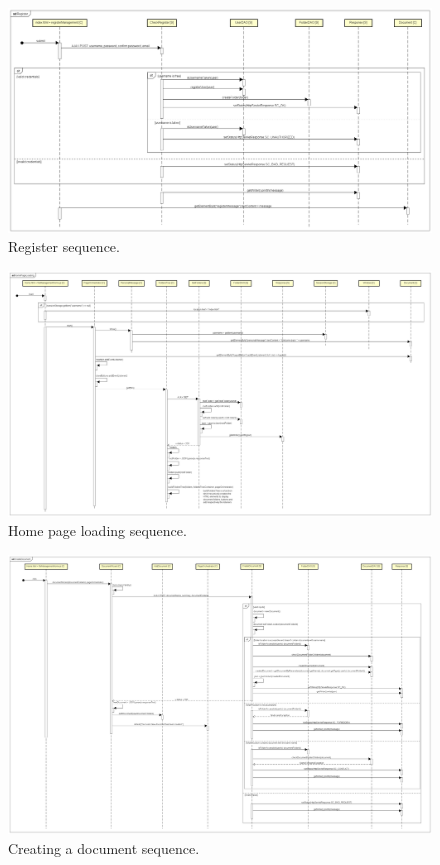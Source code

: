 \documentclass[a4paper,12pt]{article}
\begin{document}
\begin{figure}[H]
    \centering
     \includegraphics[width=1.0\textwidth]{JS/SequenceDiagram/Register.png}
    \caption{Register sequence.}
\end{figure}

\begin{figure}[H]
    \centering
     \includegraphics[width=1.0\textwidth]{JS/SequenceDiagram/HomePageLoading.png}
    \caption{Home page loading sequence.}
\end{figure}

\begin{figure}[H]
    \centering
     \includegraphics[width=1.0\textwidth]{JS/SequenceDiagram/CreateDocument.png}
    \caption{Creating a document sequence.}
\end{figure}
    
\end{document}
